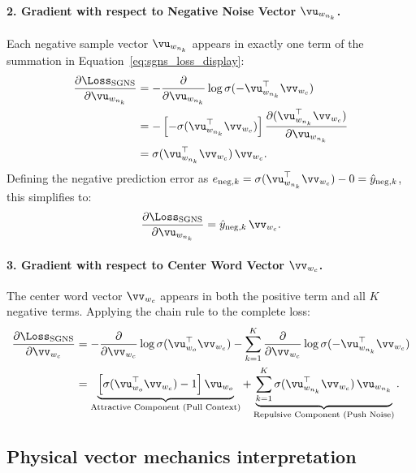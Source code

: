 \documentclass[../../main.tex]{subfiles}
\begin{document}
\paragraph{2. Gradient with respect to Negative Noise Vector $\vu_{w_{n_k}}$.}
Each negative sample vector $\vu_{w_{n_k}}$ appears in exactly one term of the summation in Equation~\eqref{eq:sgns_loss_display}:
\begin{align}
\frac{\partial \Loss_{\text{SGNS}}}{\partial \vu_{w_{n_k}}} &= -\frac{\partial}{\partial \vu_{w_{n_k}}} \log \sigma(-\vu_{w_{n_k}}^\top \vv_{w_c}) \notag \\
&= -\left[ -\sigma(\vu_{w_{n_k}}^\top \vv_{w_c}) \right] \frac{\partial (\vu_{w_{n_k}}^\top \vv_{w_c})}{\partial \vu_{w_{n_k}}} \notag \\
\label{eq:grad_u_neg}
&= \sigma(\vu_{w_{n_k}}^\top \vv_{w_c}) \, \vv_{w_c}.
\end{align}
Defining the negative prediction error as $e_{\text{neg}, k} = \sigma(\vu_{w_{n_k}}^\top \vv_{w_c}) - 0 = \hat{y}_{\text{neg}, k}$, this simplifies to:
\begin{equation}
\label{eq:grad_u_neg_clean}
\frac{\partial \Loss_{\text{SGNS}}}{\partial \vu_{w_{n_k}}} = \hat{y}_{\text{neg}, k} \, \vv_{w_c}.
\end{equation}

\paragraph{3. Gradient with respect to Center Word Vector $\vv_{w_c}$.}
The center word vector $\vv_{w_c}$ appears in both the positive term and all $K$ negative terms. Applying the chain rule to the complete loss:
\begin{align}
\frac{\partial \Loss_{\text{SGNS}}}{\partial \vv_{w_c}} &= -\frac{\partial}{\partial \vv_{w_c}} \log \sigma(\vu_{w_o}^\top \vv_{w_c}) - \sum_{k=1}^K \frac{\partial}{\partial \vv_{w_c}} \log \sigma(-\vu_{w_{n_k}}^\top \vv_{w_c}) \notag \\
\label{eq:grad_v_center}
&= \underbrace{\left[ \sigma(\vu_{w_o}^\top \vv_{w_c}) - 1 \right] \vu_{w_o}}_{\text{Attractive Component (Pull Context)}} + \underbrace{\sum_{k=1}^K \sigma(\vu_{w_{n_k}}^\top \vv_{w_c}) \, \vu_{w_{n_k}}}_{\text{Repulsive Component (Push Noise)}}.
\end{align}

\subsection{Physical vector mechanics interpretation}
\label{subsec:vector_mechanics}
\end{document}
